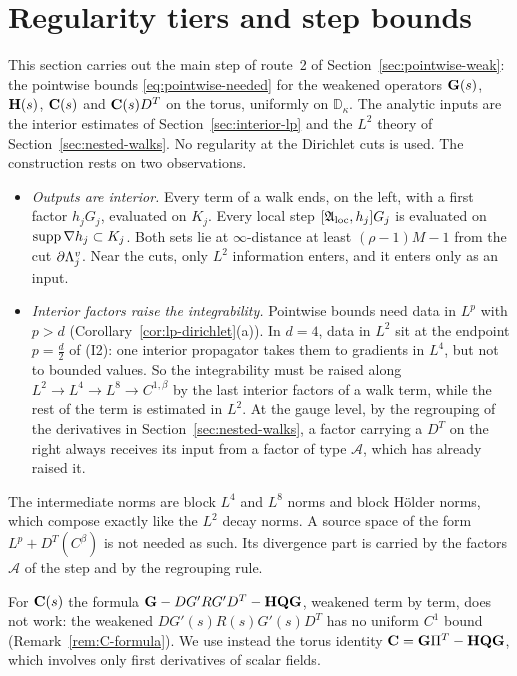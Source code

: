 \section{Regularity tiers and step bounds}\label{sec:tiers}

This section carries out the main step of route~2 of Section~\ref{sec:pointwise-weak}: the pointwise bounds \eqref{eq:pointwise-needed} for the weakened operators $\mathbf G(s)$, $\mathbf H(s)$, $\mathbf C(s)$ and $\mathbf C(s)D^T$ on the torus, uniformly on $\mathbb D_\kappa$. The analytic inputs are the interior estimates of Section~\ref{sec:interior-lp} and the $L^2$ theory of Section~\ref{sec:nested-walks}. No regularity at the Dirichlet cuts is used. The construction rests on two observations.
\begin{itemize}
\item \emph{Outputs are interior.} Every term of a walk ends, on the left, with a first factor $h_jG_j$, evaluated on $K_j$. Every local step $[\mathfrak A_{\rm loc},h_j]G_j$ is evaluated on $\operatorname{supp}\nabla h_j\subset K_j$. Both sets lie at $\infty$-distance at least $(\rho-1)M-1$ from the cut $\partial\Lambda^v_j$. Near the cuts, only $L^2$ information enters, and it enters only as an input.
\item \emph{Interior factors raise the integrability.} Pointwise bounds need data in $L^p$ with $p>d$ (Corollary~\ref{cor:lp-dirichlet}(a)). In $d=4$, data in $L^2$ sit at the endpoint $p=\frac d2$ of (I2): one interior propagator takes them to gradients in $L^4$, but not to bounded values. So the integrability must be raised along $L^2\to L^4\to L^8\to C^{1,\beta}$ by the last interior factors of a walk term, while the rest of the term is estimated in $L^2$. At the gauge level, by the regrouping of the derivatives in Section~\ref{sec:nested-walks}, a factor carrying a $D^T$ on the right always receives its input from a factor of type $\mathcal A$, which has already raised it.
\end{itemize}
The intermediate norms are block $L^4$ and $L^8$ norms and block H\"older norms, which compose exactly like the $L^2$ decay norms. A source space of the form $L^p+D^T(C^\beta)$ is not needed as such. Its divergence part is carried by the factors $\mathcal A$ of the step and by the regrouping rule.

For $\mathbf C(s)$ the formula $\mathbf G-DG'RG'D^T-\mathbf H\mathbf Q\mathbf G$, weakened term by term, does not work: the weakened $DG'(s)R(s)G'(s)D^T$ has no uniform $C^1$ bound (Remark~\ref{rem:C-formula}). We use instead the torus identity $\mathbf C=\mathbf G\Pi^T-\mathbf H\mathbf Q\mathbf G$, which involves only first derivatives of scalar fields.

